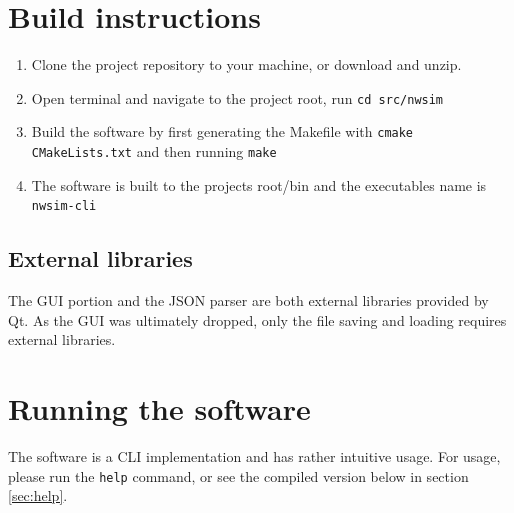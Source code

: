 \section{Build instructions}
\begin{enumerate}
    \item Clone the project repository to your machine, or download and unzip.
    \item Open terminal and navigate to the project root, run \texttt{cd src/nwsim}
    \item Build the software by first generating the Makefile with \texttt{cmake CMakeLists.txt} and then running \texttt{make}
    \item The software is built to the projects root/bin and the executables name is \texttt{nwsim-cli}
\end{enumerate}

\subsection{External libraries}
The GUI portion and the JSON parser are both external libraries provided by Qt. As the GUI was ultimately dropped, only the file saving and loading requires external libraries.

\section{Running the software}
The software is a CLI implementation and has rather intuitive usage. For usage, please run the \texttt{help} command, or see the compiled version below in section \ref{sec:help}.

